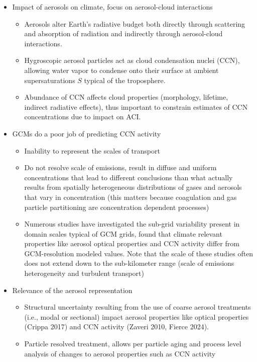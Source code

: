 \documentclass[journal abbreviation, manuscript]{copernicus}
\begin{document}
\begin{itemize}

\item Impact of aerosols on climate, focus on aerosol-cloud interactions
\begin{itemize}
\item Aerosols alter Earth's radiative budget both directly through scattering and absorption of radiation and indirectly through aerosol-cloud interactions. 
\item Hygroscopic aerosol particles act as cloud condensation nuclei (CCN), allowing water vapor to condense onto their surface at ambient supersaturations $S$ typical of the troposphere. 
\item Abundance of CCN affects cloud properties (morphology, lifetime, indirect radiative effects), thus important to constrain estimates of CCN concentrations due to impact on ACI.
\end{itemize}

\item GCMs do a poor job of predicting CCN activity
\begin{itemize}
\item Inability to represent the scales of transport 
\item Do not resolve scale of emissions, result in diffuse and uniform concentrations that lead to different conclusions than what actually results from spatially heterogeneous distributions of gases and aerosols that vary in concentration (this matters because coagulation and gas particle partitioning are concentration dependent processes)
\item Numerous studies have investigated the sub-grid variability present in domain scales typical of GCM grids, found that climate relevant properties like aerosol optical properties and CCN activity differ from GCM-resolution modeled values.
Note that the scale of these studies often does not extend down to the sub-kilometer range (scale of emissions heterogeneity and turbulent transport) 
\end{itemize}

\item Relevance of the aerosol representation
\begin{itemize}
\item Structural uncertainty resulting from the use of coarse aerosol treatments (i.e., modal or sectional) impact aerosol properties like optical properties (Crippa 2017) and CCN activity (Zaveri 2010, Fierce 2024). 
\item Particle resolved treatment, allows per particle aging and process level analysis of changes to aerosol properties such as CCN activity
\end{itemize}


\end{itemize}
\end{document}
